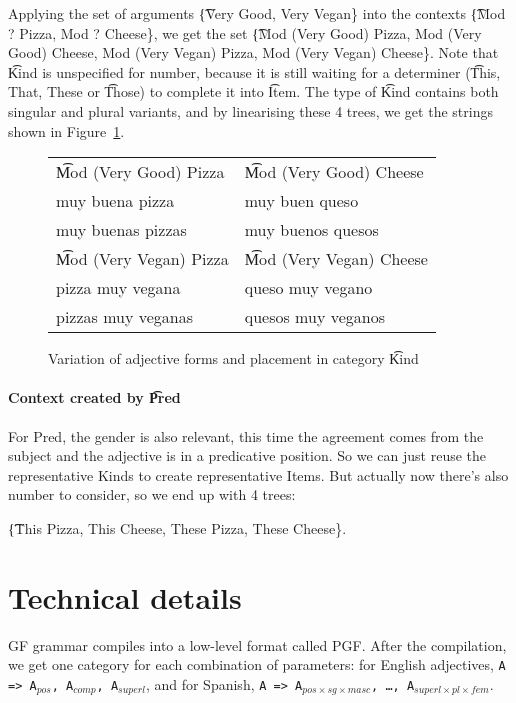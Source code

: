 Applying the set of arguments \t{\{Very Good, Very Vegan\}} into the contexts \t{\{Mod ? Pizza, Mod ? Cheese\}}, we get the set \t{\{Mod (Very Good) Pizza, Mod (Very Good) Cheese, Mod (Very Vegan) Pizza, Mod (Very Vegan) Cheese\}}. Note that \t{Kind} is unspecified for number, because it is still waiting for a determiner (\t{This, That, These} or \t{Those}) to complete it into \t{Item}. The type of \t{Kind} contains both singular and plural variants, and by linearising these 4 trees, we get the strings shown in Figure~\ref{fig:veganCheese}.

\begin{figure}
\centering
\begin{tabular}{| l | l |}
\hline
\t{Mod (Very Good) Pizza}   & \t{Mod (Very Good) Cheese} \\ 
muy buena pizza             & muy buen queso \\
muy buenas pizzas			& muy buenos quesos \\ \hline

\t{Mod (Very Vegan) Pizza}  & \t{Mod (Very Vegan) Cheese} \\
pizza muy vegana            & queso muy vegano \\
pizzas muy veganas          & quesos muy veganos \\ \hline
\end{tabular}
\caption{Variation of adjective forms and placement in category \t{Kind}}
\label{fig:veganCheese}
\end{figure}

\paragraph{Context created by \t{Pred}} 
For Pred, the gender is also relevant, this time the agreement comes from the subject and the adjective is in a predicative position. So we can just reuse the representative Kinds to create representative Items. 
But actually now there's also number to consider, so we end up with 4 trees:

 \t{\{This Pizza, This Cheese, These Pizza, These Cheese\}}.

\section{Technical details}

GF grammar compiles into a low-level format called PGF. After the
compilation, we get one category for each combination of parameters:
for English adjectives, \texttt{A => A$_{pos}$, A$_{comp}$,
A$_{superl}$}, and for Spanish, \texttt{A => A$_{pos×sg×masc}$, \dots,
A$_{superl×pl×fem}$}. 

